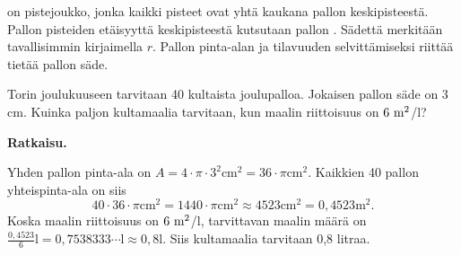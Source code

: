  on pistejoukko, jonka kaikki pisteet ovat yhtä kaukana pallon keskipisteestä. Pallon pisteiden etäisyyttä keskipisteestä kutsutaan pallon . Sädettä merkitään tavallisimmin kirjaimella $r$. Pallon pinta-alan ja tilavuuden selvittämiseksi riittää tietää pallon säde.


\begin{esimerkki}
Torin joulukuuseen tarvitaan 40 kultaista joulupalloa. Jokaisen pallon säde on 3 cm. Kuinka paljon kultamaalia tarvitaan, kun maalin riittoisuus on $6~\textnormal{m}^2$/l?

\textbf{Ratkaisu.}

Yhden pallon pinta-ala on $A= 4 \cdot \pi \cdot 3^2 \text{cm}^2=36\cdot \pi \text{cm}^2$. Kaikkien 40 pallon yhteispinta-ala on siis
$$40 \cdot 36 \cdot \pi \text{cm}^2 = 1440 \cdot \pi \text{cm}^2 \approx 4523 \text{cm}^2 =0,4523 \text{m}^2.$$
Koska maalin riittoisuus on $6~\textnormal{m}^2$/l, tarvittavan maalin määrä on $\frac{0,4523}{6}\text{l}=0,7538333 \cdots \text{l} \approx 0,8\text{l}$.
Siis kultamaalia tarvitaan 0,8 litraa.
\end{esimerkki}
